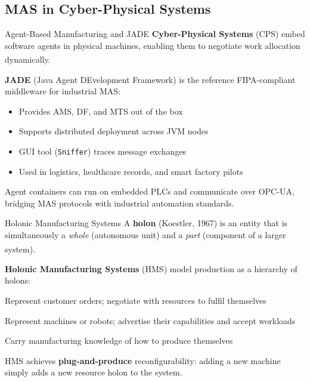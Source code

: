 \subsection{MAS in Cyber-Physical Systems}

\begin{v3topic}{Agent-Based Manufacturing and JADE}
    \textbf{Cyber-Physical Systems} (CPS) embed software agents in physical
    machines, enabling them to negotiate work allocation
    dynamically.\textsuperscript{\cite[][Ch.~3]{paolucciAgentBasedManufacturing2005}}

    \textbf{JADE} (Java Agent DEvelopment Framework) is the reference FIPA-compliant
    middleware for industrial MAS:
    \begin{itemize}
        \item Provides AMS, DF, and MTS out of the box
        \item Supports distributed deployment across JVM nodes
        \item GUI tool (\texttt{Sniffer}) traces message exchanges
        \item Used in logistics, healthcare records, and smart factory pilots
    \end{itemize}
    Agent containers can run on embedded PLCs and communicate over OPC-UA,
    bridging MAS protocols with industrial automation standards.

\end{v3topic}
\begin{v3topic}{Holonic Manufacturing Systems}
    A \textbf{holon} (Koestler, 1967) is an entity that is simultaneously a
    \emph{whole} (autonomous unit) and a \emph{part} (component of a larger
    system).\textsuperscript{\cite[][p.~102]{paolucciAgentBasedManufacturing2005}}

    \textbf{Holonic Manufacturing Systems} (HMS) model production as a
    hierarchy of holons:
    \begin{description}[leftmargin=0.6cm, labelindent=0pt]
        \item[\textbf{Order holons}] Represent customer orders; negotiate with
              resources to fulfil themselves
        \item[\textbf{Resource holons}] Represent machines or robots; advertise
              their capabilities and accept workloads
        \item[\textbf{Product holons}] Carry manufacturing knowledge of how to produce
              themselves
    \end{description}
    HMS achieves \textbf{plug-and-produce} reconfigurability: adding a new machine
    simply adds a new resource holon to the system.

\end{v3topic}

